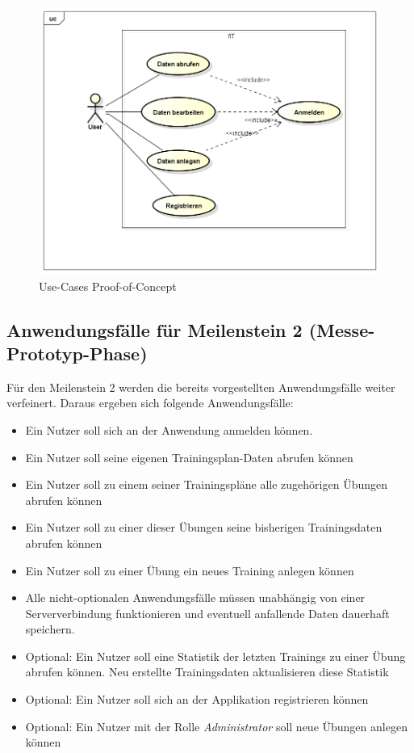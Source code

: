 \begin{figure}[h]
\centering
\includegraphics[width=0.8\linewidth]{content/images/UseCase-Proof-of-Concept.png}
\caption{Use-Cases Proof-of-Concept}
\label{pic:usecase-poc}
\end{figure}

\subsection{Anwendungsfälle für Meilenstein 2 (Messe-Prototyp-Phase)}
\label{ssec:anwendungsfaelle-messe}
Für den Meilenstein 2 werden die bereits vorgestellten Anwendungsfälle weiter verfeinert. Daraus ergeben sich folgende Anwendungsfälle:
\begin{itemize}
\item Ein Nutzer soll sich an der Anwendung anmelden können.
\item Ein Nutzer soll seine eigenen Trainingsplan-Daten abrufen können
\item Ein Nutzer soll zu einem seiner Trainingspläne alle zugehörigen Übungen abrufen können
\item Ein Nutzer soll zu einer dieser Übungen seine bisherigen Trainingsdaten abrufen können
\item Ein Nutzer soll zu einer Übung ein neues Training anlegen können
\item Alle nicht-optionalen Anwendungsfälle müssen unabhängig von einer Serververbindung funktionieren und eventuell anfallende Daten dauerhaft speichern.
\item Optional: Ein Nutzer soll eine Statistik der letzten Trainings zu einer Übung abrufen können. Neu erstellte Trainingsdaten aktualisieren diese Statistik
\item Optional: Ein Nutzer soll sich an der Applikation registrieren können
\item Optional: Ein Nutzer mit der Rolle \textit{Administrator} soll neue Übungen anlegen können
\end{itemize}

